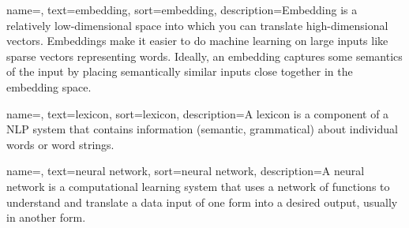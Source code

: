 {
    name=,
    text=embedding,
    sort=embedding,
    description={Embedding is a relatively low-dimensional space into which you can translate high-dimensional vectors. Embeddings make it easier to do machine learning on large inputs like sparse vectors representing words. Ideally, an embedding captures some semantics of the input by placing semantically similar inputs close together in the embedding space.}
}

{
    name=,
    text=lexicon,
    sort=lexicon,
    description={A lexicon is a component of
    a NLP system that contains information (semantic,
    grammatical) about individual words or word strings.}
}

{
    name=,
    text=neural network,
    sort=neural network,
    description={A neural network  is a computational learning system that uses a network of functions to understand and translate a data input of one form into a desired output, usually in another form. }
}


